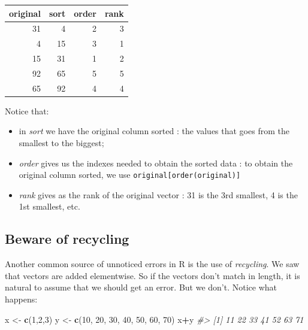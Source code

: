 \documentclass[
]{krantz}
\newenvironment{Shaded}{\begin{snugshade}}{\end{snugshade}}
\newcommand{\CommentTok}[1]{\textcolor[rgb]{0.37,0.37,0.37}{\textit{#1}}}
\newcommand{\DecValTok}[1]{\textcolor[rgb]{0.06,0.06,0.06}{#1}}
\newcommand{\KeywordTok}[1]{\textcolor[rgb]{0.27,0.27,0.27}{\textbf{#1}}}
\newcommand{\NormalTok}[1]{#1}
\newcommand{\OperatorTok}[1]{\textcolor[rgb]{0.43,0.43,0.43}{\textbf{#1}}}
\newcommand{\StringTok}[1]{\textcolor[rgb]{0.5,0.5,0.5}{#1}}
\begin{document}
\begin{table}[H]
\centering\begingroup\fontsize{8}{10}\selectfont

\begin{tabular}{rrrr}
\toprule
original & sort & order & rank\\
\midrule
31 & 4 & 2 & 3\\
4 & 15 & 3 & 1\\
15 & 31 & 1 & 2\\
92 & 65 & 5 & 5\\
65 & 92 & 4 & 4\\
\bottomrule
\end{tabular}
\endgroup{}
\end{table}

Notice that:

\begin{itemize}
\item
  in \emph{sort} we have the original column sorted : the values that goes from the smallest to the biggest;
\item
  \emph{order} gives us the indexes needed to obtain the sorted data : to obtain the original column sorted, we use \texttt{original{[}order(original){]}}
\item
  \emph{rank} gives as the rank of the original vector : 31 is the 3rd smallest, 4 is the 1st smallest, etc.
\end{itemize}

\hypertarget{beware-of-recycling}{%
\subsection{Beware of recycling}\label{beware-of-recycling}}

Another common source of unnoticed errors in R is the use of \emph{recycling}. We saw that vectors are added elementwise. So if the vectors don't match in length, it is natural to assume that we should get an error. But we don't. Notice what happens:

\begin{Shaded}
\begin{Highlighting}[]
\NormalTok{x <-}\StringTok{ }\KeywordTok{c}\NormalTok{(}\DecValTok{1}\NormalTok{,}\DecValTok{2}\NormalTok{,}\DecValTok{3}\NormalTok{)}
\NormalTok{y <-}\StringTok{ }\KeywordTok{c}\NormalTok{(}\DecValTok{10}\NormalTok{, }\DecValTok{20}\NormalTok{, }\DecValTok{30}\NormalTok{, }\DecValTok{40}\NormalTok{, }\DecValTok{50}\NormalTok{, }\DecValTok{60}\NormalTok{, }\DecValTok{70}\NormalTok{)}
\NormalTok{x}\OperatorTok{+}\NormalTok{y}
\CommentTok{#> [1] 11 22 33 41 52 63 71}
\end{Highlighting}
\end{Shaded}
\end{document}
